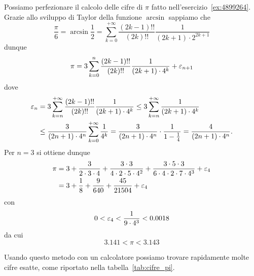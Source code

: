 \begin{exercise}
  \label{ex:cifre_pi}
  Possiamo perfezionare il calcolo delle cifre di $\pi$
  fatto nell'esercizio~\ref{ex:4899264}.
  Grazie allo sviluppo di Taylor della funzione $\arcsin$
  sappiamo che
  \[
    \frac \pi 6
    = \arcsin \frac 1 2
    = \sum_{k=0}^{+\infty} \frac{(2k-1)!!}{(2k)!!} \frac{1}{(2k+1)\cdot 2^{2k+1}}
  \]
  dunque
  \[
    \pi = 3 \sum_{k=0}^n \frac{(2k-1)!!}{(2k)!!} \frac{1}{(2k+1)\cdot 4^k} + \varepsilon_{n+1}
  \]
  dove
  \begin{align*}
   \varepsilon_n
   &= 3 \sum_{k=n}^{+\infty} \frac{(2k-1)!!}{(2k)!!} \frac{1}{(2k+1)\cdot 4^k}
   \le 3 \sum_{k=n}^{+\infty} \frac{1}{(2k+1)\cdot 4^k} \\
   &\le \frac{3}{(2n+1)\cdot 4^n} \sum_{k=0}^{+\infty} \frac{1}{4^k}
   = \frac{3}{(2n+1)\cdot 4^n} \cdot \frac{1}{1-\frac 1 4}
   = \frac{4}{(2n+1)\cdot 4^n}.
 \end{align*}
 Per $n=3$ si ottiene dunque
 \begin{align*}
  \pi
  &= 3 + \frac{3}{2\cdot 3 \cdot 4} + \frac{3\cdot 3}{4\cdot 2 \cdot 5 \cdot 4^2}
  + \frac{3\cdot 5\cdot 3}{6\cdot 4\cdot 2 \cdot 7 \cdot 4^3} + \varepsilon_4 \\
  &= 3+\frac{1}{8} + \frac{9}{640} + \frac{45}{21504} + \varepsilon_4
\end{align*}
 con
 \[
 0 < \varepsilon_4 < \frac{1}{9\cdot 4^3} < 0.0018
 \]
 da cui
 \[
   3.141 < \pi < 3.143
 \]

 Usando questo metodo con un calcolatore possiamo trovare rapidamente molte
 cifre esatte, come riportato nella tabella~\ref{tab:cifre_pi}.
\end{exercise}
%
